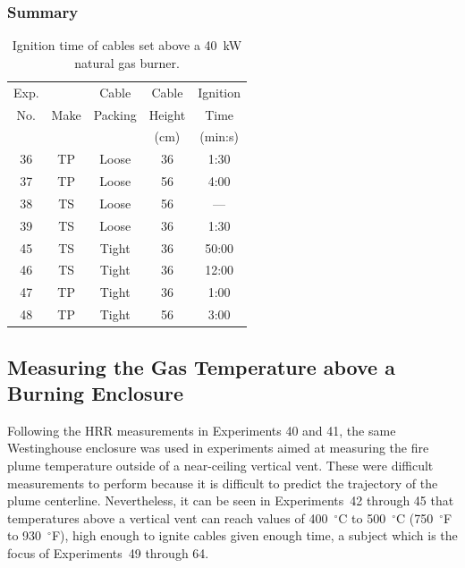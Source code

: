 \clearpage

\subsubsection{Summary}

\begin{table}[ht]
\begin{center}
\caption[Results of cable tray ignition experiments]{Ignition time of cables set above a 40~kW natural gas burner.}
\label{matrix2}
\begin{tabular}{|c|c|c|c|c|}
\hline
Exp.   &          & Cable             & Cable         & Ignition         \\
No.    & Make     & Packing           & Height        & Time             \\
       &          &                   & (cm)          & (min:s)          \\ \hline
36     & TP       & Loose             & 36            & 1:30             \\ \hline
37     & TP       & Loose             & 56            & 4:00             \\ \hline
38     & TS       & Loose             & 56            & ---              \\ \hline
39     & TS       & Loose             & 36            & 1:30             \\ \hline
45     & TS       & Tight             & 36            & 50:00            \\ \hline
46     & TS       & Tight             & 36            & 12:00            \\ \hline
47     & TP       & Tight             & 36            & 1:00             \\ \hline
48     & TP       & Tight             & 56            & 3:00             \\ \hline

\end{tabular}
\end{center}
\end{table}



\clearpage

\subsection{Measuring the Gas Temperature above a Burning Enclosure}

Following the HRR measurements in Experiments 40 and 41, the same Westinghouse enclosure was used in experiments aimed at measuring the fire plume temperature outside of a near-ceiling vertical vent. These were difficult measurements to perform because it is difficult to predict the trajectory of the plume centerline. Nevertheless, it can be seen in Experiments~42 through 45 that temperatures above a vertical vent can reach values of 400~$^\circ$C to 500~$^\circ$C (750~$^\circ$F to 930~$^\circ$F), high enough to ignite cables given enough time, a subject which is the focus of Experiments~49 through 64.



